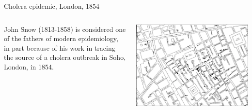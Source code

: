 \documentclass[10pt,aspectratio=169]{beamer}
\begin{document}



\begin{frame}{Cholera epidemic, London, 1854}
  \begin{columns}
    \begin{column}{.3\textwidth}
      John Snow (1813-1858) is considered one of the fathers of modern
      epidemiology, in part because of his work in tracing the source of a
      cholera outbreak in Soho, London, in 1854.
    \end{column}
    \begin{column}{.6\textwidth}
      \includegraphics[width=\textwidth]{cholera-old.png}
    \end{column}
  \end{columns}
\end{frame}
\end{document}

